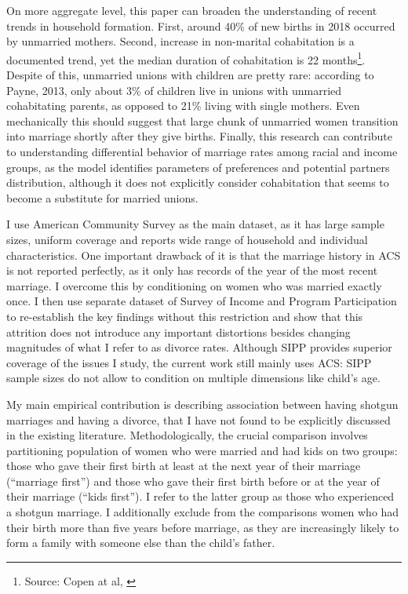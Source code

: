 \documentclass[12pt,letter]{article}
\begin{document}
On more aggregate level, this paper can broaden the understanding of recent trends in household formation. First, around 40\% of new births in 2018 occurred by unmarried mothers. Second, increase in non-marital cohabitation is a documented trend, yet the median duration of cohabitation is 22 months\footnote{Source: Copen at al,  \cite{copen}}. Despite of this, unmarried unions with children are pretty rare: according to Payne, 2013\nocite{payne}, only about 3\% of children live in unions with unmarried cohabitating parents, as opposed to 21\% living with single mothers. Even mechanically this should suggest that large chunk of unmarried women transition into marriage shortly after they give births. Finally, this research can contribute to understanding differential behavior of marriage rates among racial and income groups, as the model identifies parameters of preferences and potential partners distribution, although it does not explicitly consider cohabitation that seems to become a substitute for married unions.

I use American Community Survey as the main dataset, as it has large sample sizes, uniform coverage and reports wide range of household and individual characteristics. One important drawback of it is that the marriage history in ACS is not reported perfectly, as it only has records of the year of the most recent marriage. I overcome this by conditioning on women who was married exactly once. I then use separate dataset of Survey of Income and Program Participation to re-establish the key findings without this restriction and show that this attrition does not introduce any important distortions besides changing magnitudes of what I refer to as divorce rates. Although SIPP provides superior coverage of the issues I study, the current work still mainly uses ACS: SIPP sample sizes do not allow to condition on multiple dimensions like child's age. 

My main empirical contribution is describing association between having shotgun marriages and having a divorce, that I have not found to be explicitly discussed in the existing literature. Methodologically, the crucial comparison involves partitioning population of women who were married and had kids on two groups:  those who gave their first birth at least at the next year of their marriage (``marriage first'') and those who gave their first birth before or at the year of their marriage (``kids first''). I refer to the latter group as those who experienced a shotgun marriage. I additionally exclude from the comparisons women who had their birth more than five years before marriage, as they are increasingly likely to form a family with someone else than the child's father. 
\end{document}
